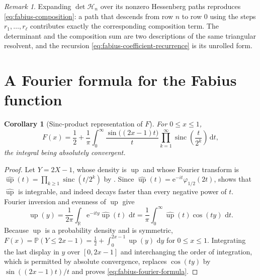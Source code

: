 \documentclass[11pt,oneside,openany]{book}
\newtheorem{corollary}[corollary]{Corollary}
\theoremstyle{definition}
\theoremstyle{remark}
\newtheorem{remark}[remark]{Remark}
\newcommand{\R}{\mathbb R}
\newcommand{\e}{\mathrm e}
\newcommand{\dd}{\,\mathrm d}
\begin{document}
\begin{remark}
Expanding $\det\mathcal H_n$ over its nonzero Hessenberg paths reproduces
\eqref{eq:fabius-composition}: a path that descends from row $n$ to row $0$ using the
steps $r_1,\ldots,r_\ell$ contributes exactly the corresponding composition term.  The
determinant and the composition sum are two descriptions of the same triangular
resolvent, and the recursion \eqref{eq:fabius-coefficient-recurrence} is its unrolled form.
\end{remark}

\section{A Fourier formula for the Fabius function}

\begin{corollary}[Sinc-product representation of $F$]\label{cor:fabius-fourier-formula}
For $0\le x\le1$,
\begin{equation}\label{eq:fabius-fourier-formula}
 F(x)=\frac12
 +\frac1\pi\int_0^{\infty}
 \frac{\sin\bigl((2x-1)t\bigr)}{t}
 \prod_{k=1}^{\infty}\operatorname{sinc}\!\left(\frac t{2^k}\right)\dd t,
\end{equation}
the integral being absolutely convergent.
\end{corollary}

\begin{proof}
Let $Y=2X-1$, whose density is $\operatorname{up}$ and whose Fourier transform is
$\widehat{\operatorname{up}}(t)=\prod_{k\ge1}\operatorname{sinc}(t/2^k)$ by
.  Since $\widehat{\operatorname{up}}(t)=\e^{-it}\varphi_{1/2}(2t)$,
 shows that
$\widehat{\operatorname{up}}$ is integrable, and indeed decays faster than every
negative power of $t$.  Fourier inversion and evenness of $\operatorname{up}$ give
\[
 \operatorname{up}(y)=\frac1{2\pi}\int_{\R}\e^{-ity}\widehat{\operatorname{up}}(t)\,\dd t
 =\frac1\pi\int_0^{\infty}\widehat{\operatorname{up}}(t)\cos(ty)\,\dd t .
\]
Because $\operatorname{up}$ is a probability density and is symmetric,
$F(x)=\mathbb P(Y\le2x-1)=\tfrac12+\int_0^{2x-1}\operatorname{up}(y)\,\dd y$ for
$0\le x\le1$.  Integrating the last display in $y$ over $[0,2x-1]$ and interchanging the
order of integration, which is permitted by absolute convergence, replaces
$\cos(ty)$ by $\sin((2x-1)t)/t$ and proves \eqref{eq:fabius-fourier-formula}.
\end{proof}
\end{document}
